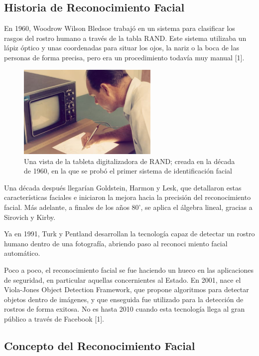 \subsection{Historia de Reconocimiento Facial}


En 1960, Woodrow Wilson Bledsoe trabajó en un sistema para clasificar los
rasgos del rostro humano a través de la tabla RAND. Este sistema utilizaba
un lápiz óptico y unas coordenadas para situar los ojos, la nariz o la boca de las
personas de forma precisa, pero era un procedimiento todavía muy manual [1].

\begin{figure}[H]
  \centering
  \includegraphics[width=0.6\textwidth]{imagenes_doc/tabla_rand.jpg}
  \caption{Una vista de la tableta digitalizadora de RAND; creada en la década de 1960, en la que se probó el primer sistema de identificación facial}
  \label{fig:logo}
\end{figure}



Una década después llegarían Goldstein, Harmon y Lesk, que detallaron
estas características faciales e iniciaron la mejora hacia la precisión del reconocimiento facial. Más adelante, a finales de los años 80', se aplica el
álgebra lineal, gracias a Sirovich y Kirby.


Ya en 1991, Turk y Pentland desarrollan la tecnología capaz de detectar
un rostro humano dentro de una fotografía, abriendo paso al reconoci
miento facial automático.


Poco a poco, el reconocimiento facial se fue haciendo un hueco en las aplicaciones de seguridad, en particular aquellas concernientes al Estado. En
2001, nace el Viola-Jones Object Detection Framework, que propone algoritmos para detectar objetos dentro de imágenes, y que enseguida fue utilizado
para la detección de rostros de forma exitosa. No es hasta 2010 cuando esta
tecnología llega al gran público a través de Facebook [1].


\subsection{Concepto del Reconocimiento Facial}

